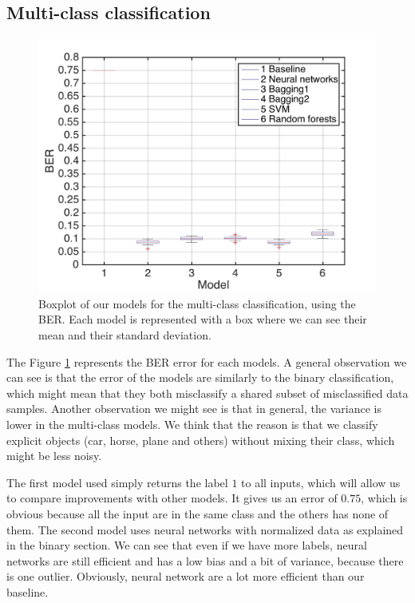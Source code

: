 \documentclass{article} %
\begin{document}
\subsection{Multi-class classification}

\begin{figure}
\center
\includegraphics[width=5in]{figures/multiclassifications.jpg} 
\caption{Boxplot of our models for the multi-class classification, using the BER. Each model is represented with a box where we can see their mean and their standard deviation.}
\label{fig:mul_models}

\vspace{-1em}
\end{figure}

The Figure \ref{fig:mul_models} represents the BER error for each models. A general observation we can see is that the error of the models are similarly to the binary classification, which might mean that they both misclassify a shared subset of misclassified data samples. 
Another observation we might see is that in general, the variance is lower in the multi-class models. We think that the reason is that we classify explicit objects (car, horse, plane and others) without mixing their class, which might be less noisy.

The first model used simply returns the label $1$ to all inputs, which will allow us to compare improvements with other models. It gives us an error of $0.75$, which is obvious because all the input are in the same class and the others has none of them. The second model uses neural networks with normalized data as explained in the binary section. We can see that even if we have more labels, neural networks are still efficient and has a low bias and a bit of variance, because there is one outlier. Obviously, neural network are a lot more efficient than our baseline.
\end{document}
